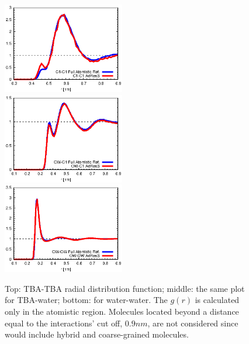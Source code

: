 \documentclass[a4paper,preprint,unsortedaddress]{revtex4-1}
\begin{document}
\begin{figure}
\center
\includegraphics[width=0.475\textwidth]{alcohol-alcohol.eps}\\
\includegraphics[width=0.475\textwidth]{alcohol-water.eps}\\
\includegraphics[width=0.475\textwidth]{water-water.eps}
\caption{Top: TBA-TBA radial distribution function; middle: the same plot for TBA-water; bottom: for water-water. The $g(r)$ is calculated only in the atomistic region.  Molecules located beyond a distance equal to the interactions' cut off, $0.9 nm$, are not considered since would include hybrid and coarse-grained molecules. \label{gr}}
\end{figure}
\end{document}
